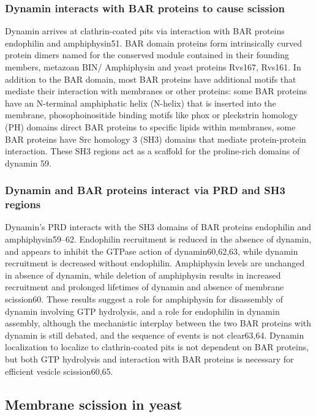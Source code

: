 		\subsubsection{Dynamin interacts with BAR proteins to cause scission}
		Dynamin arrives at clathrin-coated pits via interaction with BAR proteins endophilin and amphiphysin51. BAR domain proteins form intrinsically curved protein dimers named for the conserved module contained in their founding members, metazoan BIN/ Amphiphysin and yeast proteins Rvs167, Rvs161. In addition to the BAR domain, most BAR proteins have additional motifs that mediate their interaction with membranes or other proteins: some BAR proteins have an N-terminal amphiphatic helix (N-helix) that is inserted into the membrane, phosophoinositide binding motifs like phox or pleckstrin homology (PH) domains direct BAR proteins to specific lipids within membranes, some BAR proteins have Src homology 3 (SH3) domains that mediate protein-protein interaction. These SH3 regions act as a scaffold for the proline-rich domains of dynamin 59. 


		\subsubsection{Dynamin and BAR proteins interact via PRD and SH3 regions }
		Dynamin’s PRD interacts with the SH3 domains of BAR proteins endophilin and amphiphysin59–62. Endophilin recruitment is reduced in the absence of dynamin, and appears to inhibit the GTPase action of dynamin60,62,63, while dynamin recruitment is decreased without endophilin. Amphiphysin levels are unchanged in absence of dynamin, while deletion of amphiphysin results in increased recruitment and prolonged lifetimes of dynamin and absence of membrane scission60. These results suggest a role for amphiphysin for disassembly of dynamin involving GTP hydrolysis, and a role for endophilin in dynamin assembly, although the mechanistic interplay between the two BAR proteins with dynamin is still debated, and the sequence of events is not clear63,64. Dynamin localization to localize to clathrin-coated pits is not dependent on BAR proteins, but both GTP hydrolysis and interaction with BAR proteins is necessary for efficient vesicle scission60,65.



	\subsection{Membrane scission in yeast} \label {yeast_scission}
